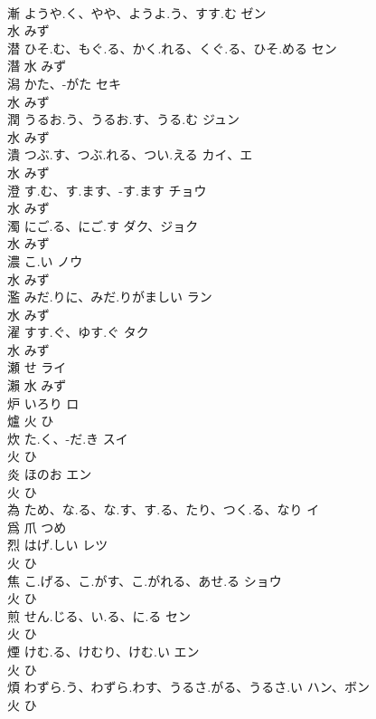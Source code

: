 \documentclass[8pt]{extreport}
\begin{document}
\begin{CJK}{UTF8}{min}
\\	漸	ようや.く、やや、ようよ.う、すす.む	ゼン	
\\	水		みず		
\\	潜	ひそ.む、もぐ.る、かく.れる、くぐ.る、ひそ.める	セン	
\\	潛	水		みず		
\\	潟	かた、-がた	セキ	
\\	水		みず		
\\	潤	うるお.う、うるお.す、うる.む	ジュン	
\\	水		みず		
\\	潰	つぶ.す、つぶ.れる、つい.える	カイ、エ	
\\	水		みず		
\\	澄	す.む、す.ます、-す.ます	チョウ	
\\	水		みず		
\\	濁	にご.る、にご.す	ダク、ジョク	
\\	水		みず		
\\	濃	こ.い	ノウ	
\\	水		みず		
\\	濫	みだ.りに、みだ.りがましい	ラン	
\\	水		みず		
\\	濯	すす.ぐ、ゆす.ぐ	タク	
\\	水		みず		
\\	瀬	せ	ライ	
\\	瀨	水		みず		
\\	炉	いろり	ロ	
\\	爐	火		ひ		
\\	炊	た.く、-だ.き	スイ	
\\	火		ひ		
\\	炎	ほのお	エン	
\\	火		ひ		
\\	為	ため、な.る、な.す、す.る、たり、つく.る、なり	イ	
\\	爲	爪		つめ		
\\	烈	はげ.しい	レツ	
\\	火		ひ		
\\	焦	こ.げる、こ.がす、こ.がれる、あせ.る	ショウ	
\\	火		ひ		
\\	煎	せん.じる、い.る、に.る	セン	
\\	火		ひ		
\\	煙	けむ.る、けむり、けむ.い	エン	
\\	火		ひ		
\\	煩	わずら.う、わずら.わす、うるさ.がる、うるさ.い	ハン、ボン	
\\	火		ひ		

\end{CJK}
\end{document}
